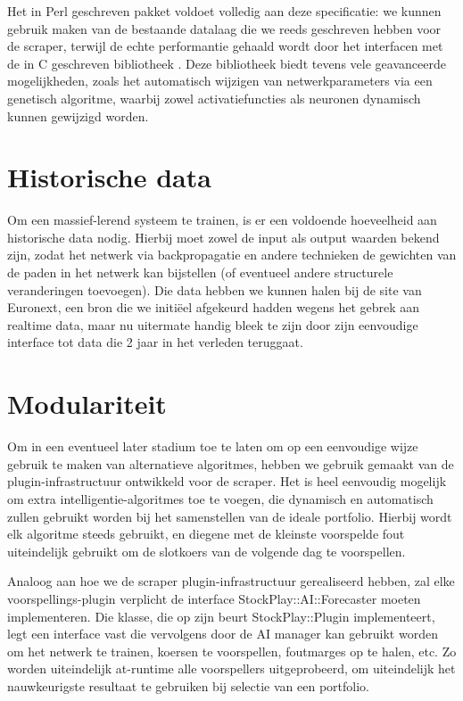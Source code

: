 Het in Perl geschreven  pakket voldoet volledig aan deze specificatie: we kunnen gebruik maken van de bestaande datalaag die we reeds geschreven hebben voor de scraper, terwijl de echte performantie gehaald wordt door het interfacen met de in C geschreven bibliotheek . Deze bibliotheek biedt tevens vele geavanceerde mogelijkheden, zoals het automatisch wijzigen van netwerkparameters via een genetisch algoritme, waarbij zowel activatiefuncties als neuronen dynamisch kunnen gewijzigd worden.


\section{Historische data}

Om een massief-lerend systeem te trainen, is er een voldoende hoeveelheid aan historische data nodig. Hierbij moet zowel de input als output waarden bekend zijn, zodat het netwerk via backpropagatie en andere technieken de gewichten van de paden in het netwerk kan bijstellen (of eventueel andere structurele veranderingen toevoegen). Die data hebben we kunnen halen bij de site van Euronext, een bron die we initi\"eel afgekeurd hadden wegens het gebrek aan realtime data, maar nu uitermate handig bleek te zijn door zijn eenvoudige interface tot data die 2 jaar in het verleden teruggaat.


\section{Modulariteit}

Om in een eventueel later stadium toe te laten om op een eenvoudige wijze gebruik te maken van alternatieve algoritmes, hebben we gebruik gemaakt van de plugin-infrastructuur ontwikkeld voor de scraper. Het is heel eenvoudig mogelijk om extra intelligentie-algoritmes toe te voegen, die dynamisch en automatisch zullen gebruikt worden bij het samenstellen van de ideale portfolio. Hierbij wordt elk algoritme steeds gebruikt, en diegene met de kleinste voorspelde fout uiteindelijk gebruikt om de slotkoers van de volgende dag te voorspellen.

Analoog aan hoe we de scraper plugin-infrastructuur gerealiseerd hebben, zal elke voorspellings-plugin  verplicht de interface StockPlay::AI::Forecaster moeten implementeren. Die klasse, die op zijn beurt StockPlay::Plugin implementeert, legt een interface vast die vervolgens door de AI manager kan gebruikt worden om het netwerk te trainen, koersen te voorspellen, foutmarges op te halen, etc. Zo worden uiteindelijk at-runtime alle voorspellers uitgeprobeerd, om uiteindelijk het nauwkeurigste resultaat te gebruiken bij selectie van een portfolio.


